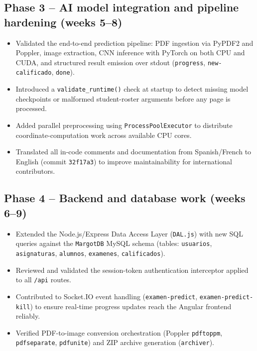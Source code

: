 \documentclass[a4paper,11pt]{article}
\begin{document}
\subsection*{Phase 3 -- AI model integration and pipeline hardening (weeks 5--8)}
\begin{itemize}[leftmargin=1.5em, itemsep=2pt]
  \item Validated the end-to-end prediction pipeline: PDF ingestion via PyPDF2 and Poppler,
        image extraction, CNN inference with PyTorch on both CPU and CUDA, and structured
        result emission over stdout (\texttt{progress}, \texttt{new-calificado}, \texttt{done}).
  \item Introduced a \texttt{validate\_runtime()} check at startup to detect missing model
        checkpoints or malformed student-roster arguments before any page is processed.
  \item Added parallel preprocessing using \texttt{ProcessPoolExecutor} to distribute
        coordinate-computation work across available CPU cores.
  \item Translated all in-code comments and documentation from Spanish/French to English
        (commit \texttt{32f17a3}) to improve maintainability for international contributors.
\end{itemize}

\subsection*{Phase 4 -- Backend and database work (weeks 6--9)}
\begin{itemize}[leftmargin=1.5em, itemsep=2pt]
  \item Extended the Node.js/Express Data Access Layer (\texttt{DAL.js}) with new SQL queries
        against the \texttt{MargotDB} MySQL schema (tables: \texttt{usuarios}, \texttt{asignaturas},
        \texttt{alumnos}, \texttt{examenes}, \texttt{calificados}).
  \item Reviewed and validated the session-token authentication interceptor applied to all
        \texttt{/api} routes.
  \item Contributed to Socket.IO event handling (\texttt{examen-predict},
        \texttt{examen-predict-kill}) to ensure real-time progress updates reach the Angular
        frontend reliably.
  \item Verified PDF-to-image conversion orchestration (Poppler \texttt{pdftoppm},
        \texttt{pdfseparate}, \texttt{pdfunite}) and ZIP archive generation (\texttt{archiver}).
\end{itemize}
\end{document}
